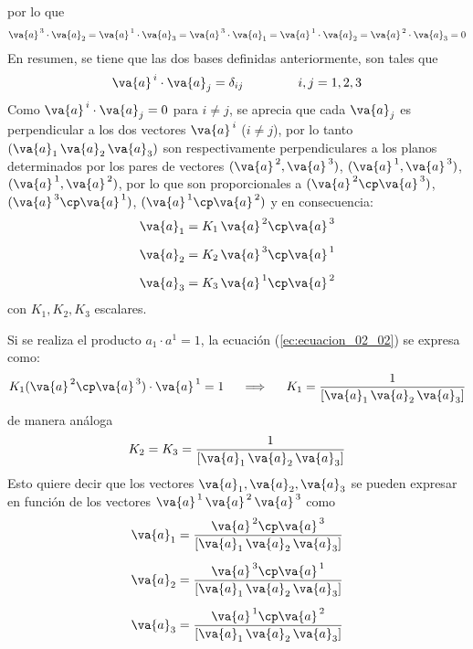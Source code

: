 por lo que
\begin{align*}
\va{a}^{\, 3} \cdot \va{a}_{2} = \va{a}^{\, 1} \cdot \va{a}_{3} = \va{a}^{\, 3} \cdot \va{a}_{1} = \va{a}^{\, 1} \cdot \va{a}_{2} = \va{a}^{\, 2} \cdot \va{a}_{3} = 0
\end{align*}
En resumen, se tiene que las dos bases definidas anteriormente, son tales que
\begin{align}
\va{a}^{\, i} \cdot \va{a}_{j} = \delta_{ij} \hspace{1.5cm} i, j = 1, 2 ,3
\label{eq:ecuacion_02_03}
\end{align}
Como $\va{a}^{\, i} \cdot \va{a}_{j} = 0$ para $ i \neq j$, se aprecia que cada $\va{a}_{j}$ es perpendicular a los dos vectores $\va{a}^{\, i}$ ($i \neq j$), por lo tanto $(\va{a}_{1} \, \va{a}_{2} \, \va{a}_{3})$ son respectivamente perpendiculares a los planos determinados por los pares de vectores $(\va{a}^{\, 2}, \va{a}^{\, 3})$, $(\va{a}^{\, 1}, \va{a}^{\, 3})$, $(\va{a}^{\, 1}, \va{a}^{\, 2})$, por lo que son proporcionales a $(\va{a}^{\, 2} \cp \va{a}^{\, 3})$, $(\va{a}^{\, 3} \cp \va{a}^{\, 1})$, $(\va{a}^{\, 1} \cp \va{a}^{\, 2})$ y en consecuencia:
\begin{align*}
\va{a}_{1} &= K_{1} \, \va{a}^{\, 2} \cp \va{a}^{\, 3} \\[0.5em]
\va{a}_{2} &= K_{2} \, \va{a}^{\, 3} \cp \va{a}^{\, 1} \\[0.5em]
\va{a}_{3} &= K_{3} \, \va{a}^{\, 1} \cp \va{a}^{\, 2}
\end{align*}
con $K_{1}, K_{2}, K_{3}$ escalares.
\par
Si se realiza el producto $a_{1} \cdot a^{1} = 1$, la ecuación (\ref{ec:ecuacion_02_02}) se expresa como:
\begin{align*}
K_{1} ( \va{a}^{\, 2} \cp \va{a}^{\, 3} ) \cdot \va{a}^{\, 1} = 1 \hspace{0.5cm} \Longrightarrow \hspace{0.5cm} K_{1} = \dfrac{1}{\left[ \va{a}_{1} \, \va{a}_{2} \, \va{a}_{3} \right]}
\end{align*}
de manera análoga
\begin{align*}
K_{2} = K_{3} = \dfrac{1}{\left[ \va{a}_{1} \, \va{a}_{2} \, \va{a}_{3} \right]}
\end{align*}
Esto quiere decir que los vectores $\va{a}_{1} , \va{a}_{2} , \va{a}_{3}$ se pueden expresar en función de los vectores $\va{a}^{\, 1} \, \va{a}^{\, 2} \, \va{a}^{\, 3}$ como
\begin{align}
\begin{aligned}
\va{a}_{1} &= \dfrac{\va{a}^{\, 2} \cp \va{a}^{\, 3}}{\left[ \va{a}_{1} \, \va{a}_{2} \, \va{a}_{3} \right]} \\[0.5em]
\va{a}_{2} &= \dfrac{\va{a}^{\, 3} \cp \va{a}^{\, 1}}{\left[ \va{a}_{1} \, \va{a}_{2} \, \va{a}_{3} \right]} \\[0.5em]
\va{a}_{3} &= \dfrac{\va{a}^{\, 1} \cp \va{a}^{\, 2}}{\left[ \va{a}_{1} \, \va{a}_{2} \, \va{a}_{3} \right]}
\end{aligned}
\label{eq:ecuacion_02_04}
\end{align}
